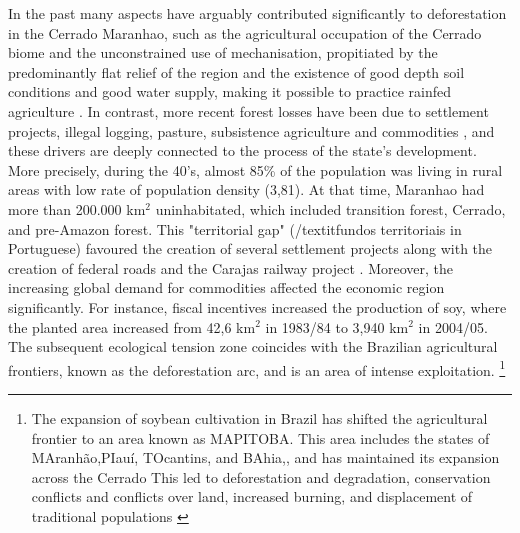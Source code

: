 In the past many aspects have arguably contributed significantly to deforestation in the Cerrado Maranhao, such as the agricultural occupation of the Cerrado biome and the unconstrained use of mechanisation, propitiated by the predominantly flat relief of the region and the existence of good depth soil conditions and good water supply, making it possible to practice rainfed agriculture \citep{bayma_sano_2015}. In contrast, more recent forest losses  have been due to settlement projects, illegal logging, pasture, subsistence agriculture and commodities \citep{CELENTANO_2017, costa_2018}, and these drivers are deeply connected to the process of the state's development. More precisely, during the 40's, almost 85\% of the population was living in rural areas with low rate of population density (3,81). At that time, Maranhao had more than 200.000 km$^{2}$ uninhabitated, which included transition forest, Cerrado, and pre-Amazon forest. This "territorial gap" (/textit{fundos territoriais} in Portuguese) favoured the creation of several settlement projects along with the creation of federal roads and the Carajas railway project \citep{ferreira_2008}. Moreover, the increasing global demand for commodities affected the economic region significantly. For instance, fiscal incentives increased the production of soy, where the planted area increased from 42,6 km$^{2}$  in 1983/84 to 3,940 km$^{2}$ in 2004/05. The subsequent ecological tension zone coincides with the Brazilian agricultural frontiers, known as the deforestation arc, and is an area of intense exploitation. \footnote{The expansion of soybean cultivation in Brazil has shifted the
agricultural frontier to an area  known as MAPITOBA. This area includes the states of MAranhão,PIauí, TOcantins, and BAhia,, and has maintained its expansion across the Cerrado This led to deforestation and degradation, conservation conflicts and conflicts over land, increased burning, and displacement of traditional populations \citep{mustin__2017}}


